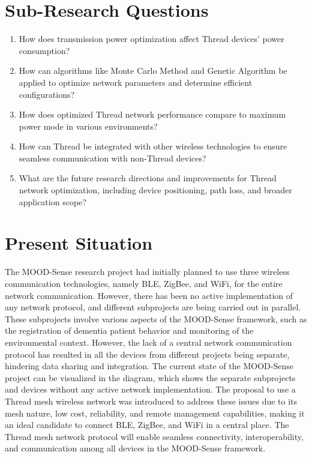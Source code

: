 \section{Sub-Research Questions}
\vspace{2mm}
\begin{enumerate}
    \item How does transmission power optimization affect Thread devices' power consumption?
    \item How can algorithms like Monte Carlo Method and Genetic Algorithm be applied to optimize network parameters and determine efficient configurations?
    \item How does optimized Thread network performance compare to maximum power mode in various environments?
    \item How can Thread be integrated with other wireless technologies to ensure seamless communication with non-Thread devices?
    \item What are the future research directions and improvements for Thread network optimization, including device positioning, path loss, and broader application scope?
\end{enumerate}
\vspace{3mm}


\section{Present Situation}
The MOOD-Sense research project had initially planned to use three wireless communication technologies, namely BLE, ZigBee, and WiFi, for the entire network communication. However, there has been no active implementation of any network protocol, and different subprojects are being carried out in parallel. These subprojects involve various aspects of the MOOD-Sense framework, such as the registration of dementia patient behavior and monitoring of the environmental context. However, the lack of a central network communication protocol has resulted in all the devices from different projects being separate, hindering data sharing and integration. The current state of the MOOD-Sense project can be visualized in the diagram, which shows the separate subprojects and devices without any active network implementation. The proposal to use a Thread mesh wireless network was introduced to address these issues due to its mesh nature, low cost, reliability, and remote management capabilities, making it an ideal candidate to connect BLE, ZigBee, and WiFi in a central place. The Thread mesh network protocol will enable seamless connectivity, interoperability, and communication among all devices in the MOOD-Sense framework.

